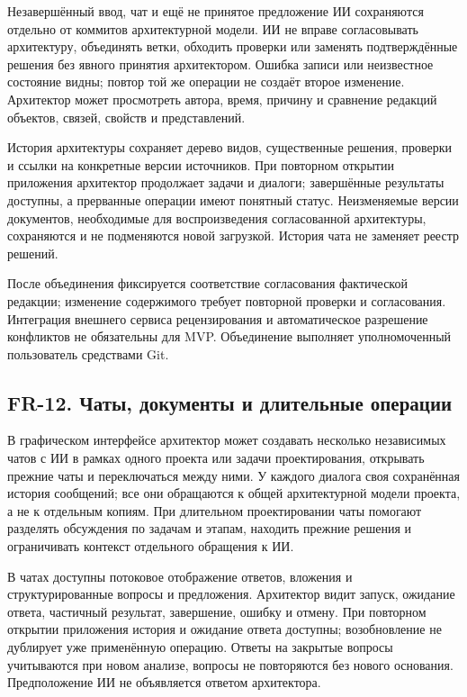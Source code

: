 \documentclass[10pt,a4paper]{article}
\begin{document}
Незавершённый ввод, чат и ещё не принятое предложение ИИ сохраняются отдельно от коммитов архитектурной модели. ИИ не вправе согласовывать архитектуру, объединять ветки, обходить проверки или заменять подтверждённые решения без явного принятия архитектором. Ошибка записи или неизвестное состояние видны; повтор той же операции не создаёт второе изменение. Архитектор может просмотреть автора, время, причину и сравнение редакций объектов, связей, свойств и представлений.

История архитектуры сохраняет дерево видов, существенные решения, проверки и ссылки на конкретные версии источников. При повторном открытии приложения архитектор продолжает задачи и диалоги; завершённые результаты доступны, а прерванные операции имеют понятный статус. Неизменяемые версии документов, необходимые для воспроизведения согласованной архитектуры, сохраняются и не подменяются новой загрузкой. История чата не заменяет реестр решений.

После объединения фиксируется соответствие согласования фактической редакции; изменение содержимого требует повторной проверки и согласования. Интеграция внешнего сервиса рецензирования и автоматическое разрешение конфликтов не обязательны для MVP. Объединение выполняет уполномоченный пользователь средствами Git.

\subsection{FR-12. Чаты, документы и длительные операции}\label{fr-12-ux447ux430ux442ux44b-ux434ux43eux43aux443ux43cux435ux43dux442ux44b-ux438-ux434ux43bux438ux442ux435ux43bux44cux43dux44bux435-ux43eux43fux435ux440ux430ux446ux438ux438}

В графическом интерфейсе архитектор может создавать несколько независимых чатов с ИИ в рамках одного проекта или задачи проектирования, открывать прежние чаты и переключаться между ними. У каждого диалога своя сохранённая история сообщений; все они обращаются к общей архитектурной модели проекта, а не к отдельным копиям. При длительном проектировании чаты помогают разделять обсуждения по задачам и этапам, находить прежние решения и ограничивать контекст отдельного обращения к ИИ.

В чатах доступны потоковое отображение ответов, вложения и структурированные вопросы и предложения. Архитектор видит запуск, ожидание ответа, частичный результат, завершение, ошибку и отмену. При повторном открытии приложения история и ожидание ответа доступны; возобновление не дублирует уже применённую операцию. Ответы на закрытые вопросы учитываются при новом анализе, вопросы не повторяются без нового основания. Предположение ИИ не объявляется ответом архитектора.
\end{document}
